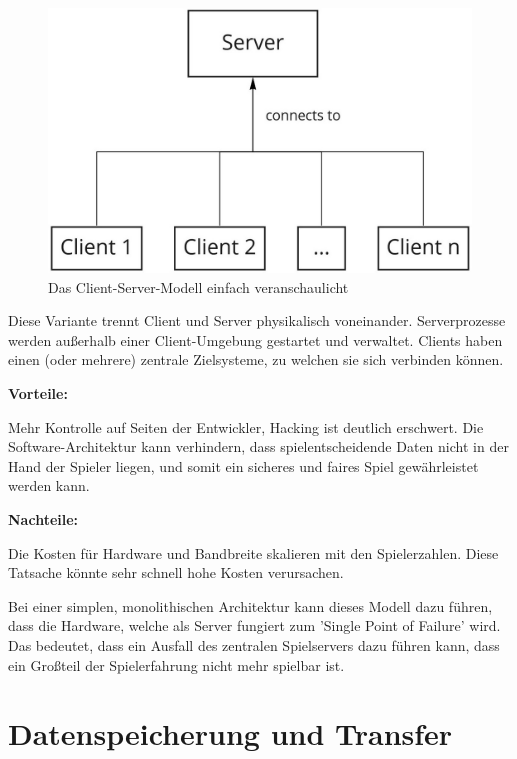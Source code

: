 \begin{figure}[H]
\centering
\includegraphics[width=150mm]{images/Client_Server.jpg}
\caption[Client-Server Modell]{Das Client-Server-Modell einfach veranschaulicht}
\label{pic:Client_Server}
\end{figure}



Diese Variante trennt Client und Server physikalisch voneinander. Serverprozesse werden außerhalb einer Client-Umgebung gestartet und verwaltet. Clients haben einen (oder mehrere) zentrale Zielsysteme, zu welchen sie sich verbinden können.

\textbf{Vorteile:}

Mehr Kontrolle auf Seiten der Entwickler, Hacking ist deutlich erschwert. Die Software-Architektur kann verhindern, dass spielentscheidende Daten nicht in der Hand der Spieler liegen, und somit ein sicheres und faires Spiel gewährleistet werden kann.
\cite{Smed.2002}

\textbf{Nachteile:}

Die Kosten für Hardware und Bandbreite skalieren mit den Spielerzahlen. Diese Tatsache könnte sehr schnell hohe Kosten verursachen. \cite{Deng.2018}

Bei einer simplen, monolithischen Architektur kann dieses Modell dazu führen, dass die Hardware, welche als Server fungiert zum 'Single Point of Failure' wird. Das bedeutet, dass ein Ausfall des zentralen Spielservers dazu führen kann, dass ein Großteil der Spielerfahrung nicht mehr spielbar ist.

\section{Datenspeicherung und Transfer}

